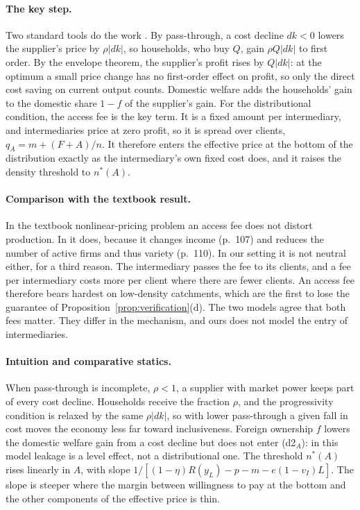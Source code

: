 \documentclass[12pt]{article}
\theoremstyle{remark}
\begin{document}
\paragraph{The key step.} Two standard tools do the work \citep{weyl2013passthrough}. By pass-through, a cost decline $dk<0$ lowers the supplier's price by $\rho|dk|$, so households, who buy $Q$, gain $\rho Q|dk|$ to first order. By the envelope theorem, the supplier's profit rises by $Q|dk|$: at the optimum a small price change has no first-order effect on profit, so only the direct cost saving on current output counts. Domestic welfare adds the households' gain to the domestic share $1-f$ of the supplier's gain. For the distributional condition, the access fee is the key term. It is a fixed amount per intermediary, and intermediaries price at zero profit, so it is spread over clients, $q_A=m+(F+A)/n$. It therefore enters the effective price at the bottom of the distribution exactly as the intermediary's own fixed cost does, and it raises the density threshold to $n^*(A)$.

\paragraph{Comparison with the textbook result.} In the textbook nonlinear-pricing problem an access fee does not distort production. In \citet{athey2026competition} it does, because it changes income (p.~107) and reduces the number of active firms and thus variety (p.~110). In our setting it is not neutral either, for a third reason. The intermediary passes the fee to its clients, and a fee per intermediary costs more per client where there are fewer clients. An access fee therefore bears hardest on low-density catchments, which are the first to lose the guarantee of Proposition~\ref{prop:verification}(d). The two models agree that both fees matter. They differ in the mechanism, and ours does not model the entry of intermediaries.

\paragraph{Intuition and comparative statics.} When pass-through is incomplete, $\rho<1$, a supplier with market power keeps part of every cost decline. Households receive the fraction $\rho$, and the progressivity condition is relaxed by the same $\rho|dk|$, so with lower pass-through a given fall in cost moves the economy less far toward inclusiveness. Foreign ownership $f$ lowers the domestic welfare gain from a cost decline but does not enter (d2$_A$): in this model leakage is a level effect, not a distributional one. The threshold $n^*(A)$ rises linearly in $A$, with slope $1/[(1-\eta)R(y_L)-p-m-e(1-v_I)L]$. The slope is steeper where the margin between willingness to pay at the bottom and the other components of the effective price is thin.
\end{document}
